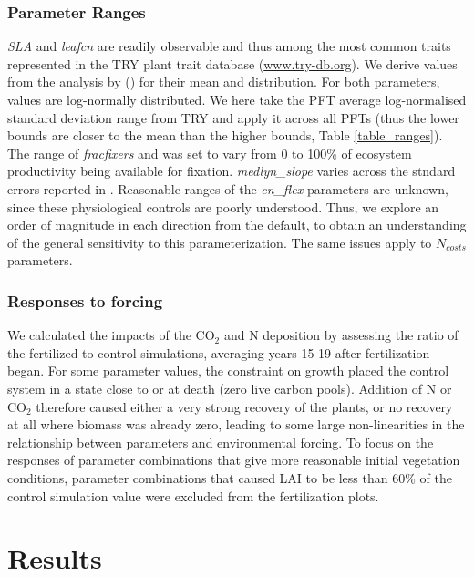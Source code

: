 \documentclass[draft,linenumbers]{agujournal}
\begin{document}
\subsubsection{Parameter Ranges}
\emph{SLA} and \emph{leafcn} are readily observable and thus among the most common traits represented in the TRY plant trait database (\url{www.try-db.org}). We derive values from the analysis by (\cite{kattge2011}) for their mean and distribution. For both parameters, values are log-normally distributed. We here take the PFT average log-normalised standard deviation range from TRY and apply it across all PFTs (thus the lower bounds are closer to the mean than the higher bounds, Table \ref{table_ranges}). The range of \emph{fracfixers} and was set to vary from 0 to 100\% of ecosystem productivity being available for fixation.  \emph{medlyn\_slope} varies across the stndard errors reported in \cite{dekauwe2015}. Reasonable ranges of the \emph{cn\_flex} parameters are unknown, since these physiological controls are poorly understood. Thus, we explore an order of magnitude in each direction from the default, to obtain an understanding of the general sensitivity to this parameterization. The same issues apply to $N_{costs}$ parameters. 

\subsubsection{Responses to forcing}
We calculated the impacts of the CO$_{2}$ and N deposition by assessing the ratio of the fertilized to control simulations, averaging years 15-19 after fertilization began. For some parameter values, the constraint on growth placed the control system in a state close to or at death (zero live carbon pools). Addition of N or CO$_{2}$ therefore caused either a very strong recovery of the plants, or no recovery at all where biomass was already zero, leading to some large non-linearities in the relationship between parameters and environmental forcing. To focus on the responses of parameter combinations that give more reasonable initial vegetation conditions, parameter combinations that caused LAI to be less than 60\% of the control simulation value were excluded from the fertilization plots.

\section{Results}
\end{document}
